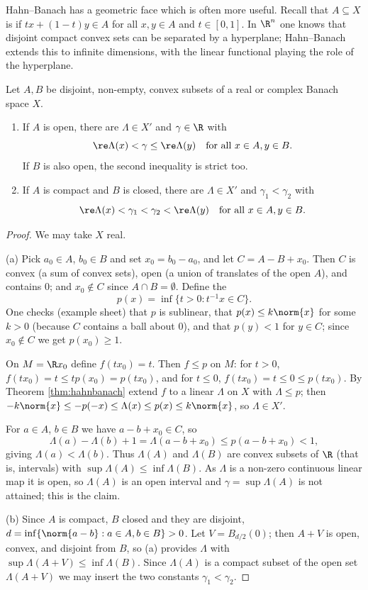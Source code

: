 Hahn--Banach has a geometric face which is often more useful. Recall that $A \subseteq X$ is  if $tx + (1-t)y \in A$ for all $x,y \in A$ and $t \in [0,1]$. In $\R^n$ one knows that disjoint compact convex sets can be separated by a hyperplane; Hahn--Banach extends this to infinite dimensions, with the linear functional playing the role of the hyperplane.

\begin{theorem}\label{thm:geomhb}
	Let $A, B$ be disjoint, non-empty, convex subsets of a real or complex Banach space $X$.
	\begin{enumerate}[label=(\alph*)]
		\item If $A$ is open, there are $\Lambda \in X'$ and $\gamma \in \R$ with
		$$\re \Lambda(x) < \gamma \le \re \Lambda(y) \quad \text{for all } x \in A, y \in B.$$
		If $B$ is also open, the second inequality is strict too.
		\item If $A$ is compact and $B$ is closed, there are $\Lambda \in X'$ and $\gamma_1 < \gamma_2$ with
		$$\re \Lambda(x) < \gamma_1 < \gamma_2 < \re \Lambda(y) \quad \text{for all } x \in A, y \in B.$$
	\end{enumerate}
\end{theorem}

\begin{proof}
	We may take $X$ real.

	(a) Pick $a_0 \in A$, $b_0 \in B$ and set $x_0 = b_0 - a_0$, and let $C = A - B + x_0$. Then $C$ is convex (a sum of convex sets), open (a union of translates of the open $A$), and contains $0$; and $x_0 \notin C$ since $A \cap B = \emptyset$. Define the 
	$$p(x) = \inf\{t > 0 : t^{-1}x \in C\}.$$
	One checks (example sheet) that $p$ is sublinear, that $p(x) \le k \norm{x}$ for some $k > 0$ (because $C$ contains a ball about $0$), and that $p(y) < 1$ for $y \in C$; since $x_0 \notin C$ we get $p(x_0)\ge 1$.

	On $M = \R x_0$ define $f(tx_0) = t$. Then $f \le p$ on $M$: for $t > 0$, $f(tx_0) = t \le tp(x_0) = p(tx_0)$, and for $t \le 0$, $f(tx_0) = t \le 0 \le p(tx_0)$. By Theorem \ref{thm:hahnbanach} extend $f$ to a linear $\Lambda$ on $X$ with $\Lambda \le p$; then $-k\norm{x} \le -p(-x) \le \Lambda(x) \le p(x) \le k\norm{x}$, so $\Lambda \in X'$.

	For $a \in A$, $b\in B$ we have $a - b + x_0 \in C$, so
	$$\Lambda(a) - \Lambda(b) + 1 = \Lambda(a - b + x_0) \le p(a-b+x_0) < 1,$$
	giving $\Lambda(a) < \Lambda(b)$. Thus $\Lambda(A)$ and $\Lambda(B)$ are convex subsets of $\R$ (that is, intervals) with $\sup \Lambda(A) \le \inf \Lambda(B)$. As $\Lambda$ is a non-zero continuous linear map it is open, so $\Lambda(A)$ is an open interval and $\gamma = \sup\Lambda(A)$ is not attained; this is the claim.

	(b) Since $A$ is compact, $B$ closed and they are disjoint, $d = \inf\{\norm{a-b} : a \in A, b\in B\} > 0$. Let $V = B_{d/2}(0)$; then $A + V$ is open, convex, and disjoint from $B$, so (a) provides $\Lambda$ with $\sup \Lambda(A+V) \le \inf \Lambda(B)$. Since $\Lambda(A)$ is a compact subset of the open set $\Lambda(A+V)$ we may insert the two constants $\gamma_1 < \gamma_2$.
\end{proof}

